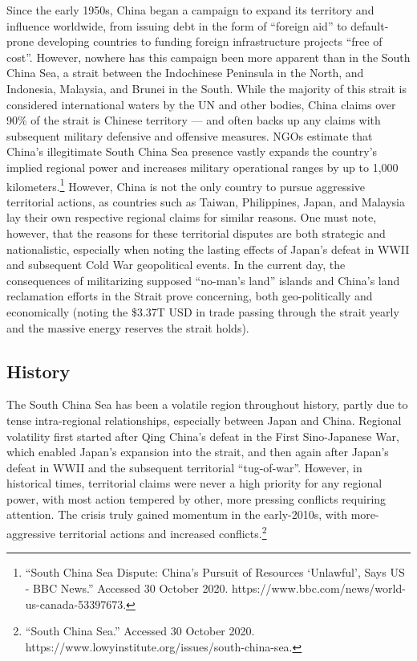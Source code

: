 \documentclass[10pt, letterpaper]{article}
\begin{document}
 Since the early 1950s, China began a campaign to expand its
territory and influence worldwide, from issuing debt in the form of
``foreign aid'' to default-prone developing countries to funding foreign
infrastructure projects ``free of cost''. However, nowhere has this
campaign been more apparent than in the South China Sea, a strait
between the Indochinese Peninsula in the North, and Indonesia, Malaysia,
and Brunei in the South. While the majority of this strait is considered
international waters by the UN and other bodies, China claims over 90\%
of the strait is Chinese territory --- and often backs up any claims
with subsequent military defensive and offensive measures. NGOs estimate
that China's illegitimate South China Sea presence vastly expands the
country's implied regional power and increases military operational
ranges by up to 1,000 kilometers.\footnote{``South China Sea Dispute:
  China's Pursuit of Resources `Unlawful', Says US - BBC News.''
  Accessed 30 October 2020.
  https://www.bbc.com/news/world-us-canada-53397673.} However, China is
not the only country to pursue aggressive territorial actions, as
countries such as Taiwan, Philippines, Japan, and Malaysia lay their own
respective regional claims for similar reasons. One must note, however,
that the reasons for these territorial disputes are both strategic and
nationalistic, especially when noting the lasting effects of Japan's
defeat in WWII and subsequent Cold War geopolitical events. In the
current day, the consequences of militarizing supposed ``no-man's land''
islands and China's land reclamation efforts in the Strait prove
concerning, both geo-politically and economically (noting the \$3.37T
USD in trade passing through the strait yearly and the massive energy
reserves the strait holds). \\

\subsection{History}

 The South China Sea has been a volatile region throughout
history, partly due to tense intra-regional relationships, especially
between Japan and China. Regional volatility first started after Qing
China's defeat in the First Sino-Japanese War, which enabled Japan's
expansion into the strait, and then again after Japan's defeat in WWII
and the subsequent territorial ``tug-of-war''. However, in historical
times, territorial claims were never a high priority for any regional
power, with most action tempered by other, more pressing conflicts
requiring attention. The crisis truly gained momentum in the
early-2010s, with more-aggressive territorial actions and increased
conflicts.\footnote{``South China Sea.'' Accessed 30 October 2020.
  https://www.lowyinstitute.org/issues/south-china-sea.} \\
\end{document}
